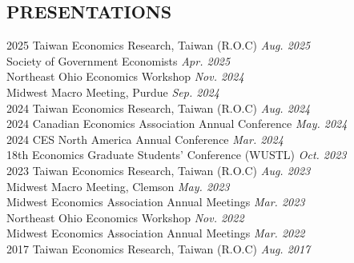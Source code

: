 \documentclass[11pt]{res} %
\begin{document}
\begin{resume}
\section{PRESENTATIONS}%
\label{sub:conference_paper}
\vspace{8pt} %
2025 Taiwan Economics Research, Taiwan (R.O.C) \hfill  \textit{Aug. 2025} \\
Society of Government Economists \hfill \textit{Apr. 2025} \\
Northeast Ohio Economics Workshop \hfill \textit{Nov. 2024} \\
Midwest Macro Meeting, Purdue \hfill \textit{Sep. 2024} \\
2024 Taiwan Economics Research, Taiwan (R.O.C) \hfill  \textit{Aug. 2024} \\
2024 Canadian Economics Association Annual Conference \hfill \textit{May. 2024} \\
2024 CES North America Annual Conference \hfill \textit{Mar. 2024} \\
18th Economics Graduate Students' Conference (WUSTL) \hfill \textit{Oct. 2023} \\
2023 Taiwan Economics Research, Taiwan (R.O.C) \hfill  \textit{Aug. 2023} \\
Midwest Macro Meeting, Clemson \hfill \textit{May. 2023} \\
Midwest Economics Association Annual Meetings \hfill \textit{Mar. 2023} \\
Northeast Ohio Economics Workshop \hfill \textit{Nov. 2022} \\
Midwest Economics Association Annual Meetings \hfill \textit{Mar. 2022} \\
2017 Taiwan Economics Research, Taiwan (R.O.C) \hfill  \textit{Aug. 2017}



\end{resume}
\end{document}
